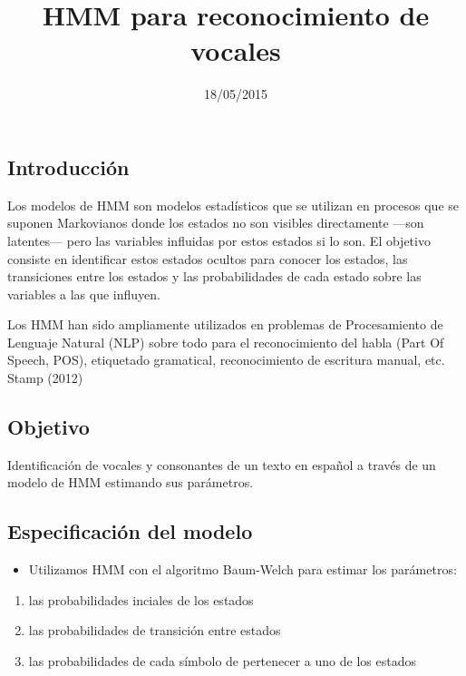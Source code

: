 \documentclass[]{article}
\title{HMM para reconocimiento de vocales}
\author{}
\date{18/05/2015}
\begin{document}
\maketitle


{
\hypersetup{linkcolor=black}
\setcounter{tocdepth}{2}
\tableofcontents
}
\pagebreak

\subsection{Introducción}\label{introduccion}

Los modelos de HMM son modelos estadísticos que se utilizan en procesos
que se suponen Markovianos donde los estados no son visibles
directamente ---son latentes--- pero las variables influidas por estos
estados si lo son. El objetivo consiste en identificar estos estados
ocultos para conocer los estados, las transiciones entre los estados y
las probabilidades de cada estado sobre las variables a las que
influyen.

Los HMM han sido ampliamente utilizados en problemas de Procesamiento de
Lenguaje Natural (NLP) sobre todo para el reconocimiento del habla (Part
Of Speech, POS), etiquetado gramatical, reconocimiento de escritura
manual, etc. Stamp (2012)

\subsection{Objetivo}\label{objetivo}

Identificación de vocales y consonantes de un texto en español a través
de un modelo de HMM estimando sus parámetros.

\subsection{Especificación del modelo}\label{especificacion-del-modelo}

\begin{itemize}
\itemsep1pt\parskip0pt
\item
  Utilizamos HMM con el algoritmo Baum-Welch para estimar los
  parámetros:
\end{itemize}

\begin{enumerate}
\def\labelenumi{\arabic{enumi}.}
\itemsep1pt\parskip0pt
\item
  las probabilidades inciales de los estados
\item
  las probabilidades de transición entre estados
\item
  las probabilidades de cada símbolo de pertenecer a uno de los estados
\end{enumerate}
\end{document}
